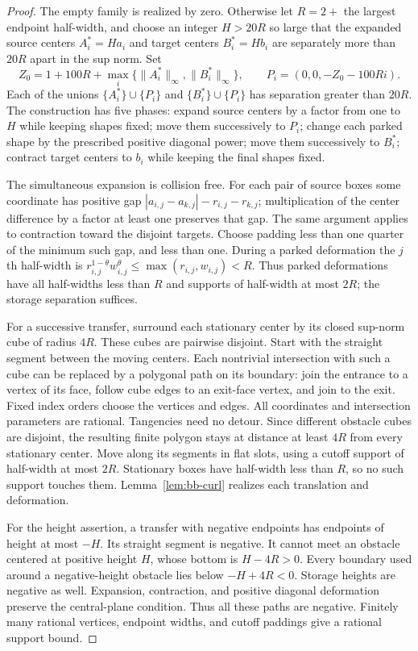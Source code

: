 \begin{proof}\label{bc:expanded-height-routing-proof}
The empty family is realized by zero. Otherwise let $R=2+$ the largest
endpoint half-width, and choose an integer $H>20R$ so large that the
expanded source centers $A_i^*=Ha_i$ and target centers $B_i^*=Hb_i$
are separately more than $20R$ apart in the sup norm. Set
\[
 Z_0=1+100R+\max_i\{\|A_i^*\|_\infty,\|B_i^*\|_\infty\},
 \qquad P_i=(0,0,-Z_0-100Ri).
\]
Each of the unions $\{A_i^*\}\cup\{P_i\}$ and
$\{B_i^*\}\cup\{P_i\}$ has separation greater than $20R$.
The construction has five phases: expand source centers by a factor
from one to $H$ while keeping shapes fixed; move them successively to
$P_i$; change each parked shape by the prescribed positive diagonal
power; move them successively to $B_i^*$; contract target centers to
$b_i$ while keeping the final shapes fixed.

The simultaneous expansion is collision free. For each pair of source
boxes some coordinate has positive gap
$|a_{i,j}-a_{k,j}|-r_{i,j}-r_{k,j}$; multiplication of the center
difference by a factor at least one preserves that gap. The same
argument applies to contraction toward the disjoint targets. Choose
padding less than one quarter of the minimum such gap, and less than
one. During a parked deformation the $j$th half-width is
$r_{i,j}^{1-\theta}w_{i,j}^{\theta}\le\max(r_{i,j},w_{i,j})<R$.
Thus parked deformations have all half-widths less than $R$ and
supports of half-width at most $2R$; the storage separation suffices.

For a successive transfer, surround each stationary center by its closed
sup-norm cube of radius $4R$. These cubes are pairwise disjoint. Start
with the straight segment between the moving centers. Each nontrivial
intersection with such a cube can be replaced by a polygonal path on
its boundary: join the entrance to a vertex of its face, follow cube
edges to an exit-face vertex, and join to the exit. Fixed index orders
choose the vertices and edges. All coordinates and intersection parameters
are rational. Tangencies need no detour. Since different obstacle cubes
are disjoint, the resulting finite polygon stays at distance at least
$4R$ from every stationary center. Move along its segments in flat slots,
using a cutoff support of half-width at most $2R$. Stationary boxes have
half-width less than $R$, so no such support touches them. Lemma~\ref{lem:bb-curl}
realizes each translation and deformation.

For the height assertion, a transfer with negative endpoints has endpoints
of height at most $-H$. Its straight segment is negative. It cannot meet
an obstacle centered at positive height $H$, whose bottom is $H-4R>0$.
Every boundary used around a negative-height obstacle lies below
$-H+4R<0$. Storage heights are negative as well. Expansion, contraction,
and positive diagonal deformation preserve the central-plane condition.
Thus all these paths are negative. Finitely many rational vertices,
endpoint widths, and cutoff paddings give a rational support bound.
\end{proof}


